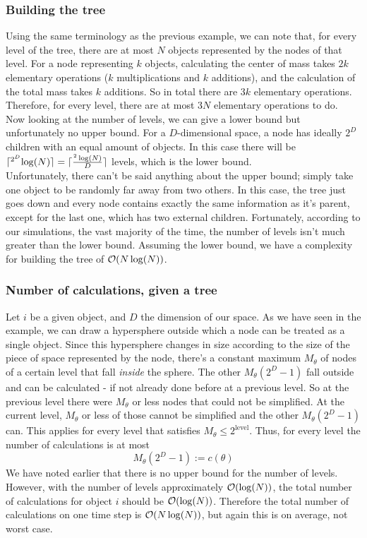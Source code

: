 \subsubsection*{Building the tree} Using the same terminology as the previous example, we can note that, for every level of the tree, there are at most $N$ objects represented by the nodes of that level. For a node representing $k$ objects, calculating the center of mass takes $2k$ elementary operations ($k$ multiplications and $k$ additions), and the calculation of the total mass takes $k$ additions. So in total there are $3k$ elementary operations. Therefore, for every level, there are at most $3N$ elementary operations to do.\\
Now looking at the number of levels, we can give a lower bound but unfortunately no upper bound. For a $D$-dimensional space, a node has ideally $2^D$ children with an equal amount of objects. In this case there will be $\lceil ^{2^D} \log(N) \rceil = \lceil \frac{^2\log(N)}{D} \rceil$ levels, which is the lower bound.\\
Unfortunately, there can't be said anything about the upper bound; simply take one object to be randomly far away from two others. In this case, the tree just goes down and every node contains exactly the same information as it's parent, except for the last one, which has two external children. Fortunately, according to our simulations, the vast majority of the time, the number of levels isn't much greater than the lower bound. Assuming the lower bound, we have a complexity for building the tree of $\mathcal{O}(N\log(N))$.
\subsubsection*{Number of calculations, given a tree} Let $i$ be a given object, and $D$ the dimension of our space. As we have seen in the example, we can draw a hypersphere outside which a node can be treated as a single object. Since this hypersphere changes in size according to the size of the piece of space represented by the node, there's a constant maximum $M_\theta$ of nodes of a certain level that fall \textit{inside} the sphere. The other $M_\theta(2^D-1)$ fall outside and can be calculated - if not already done before at a previous level. So at the previous level there were $M_\theta$ or less nodes that could not be simplified. At the current level, $M_\theta$ or less of those cannot be simplified and the other $M_\theta(2^D-1)$ can. This applies for every level that satisfies $M_\theta \leq 2^{\text{level}}$. Thus, for every level the number of calculations is at most
\[
M_\theta (2^D-1) := c(\theta)
\]
We have noted earlier that there is no upper bound for the number of levels. However, with the number of levels approximately $\mathcal{O}(\log(N))$, the total number of calculations for object $i$ should be $\mathcal{O}(\log(N))$. Therefore the total number of calculations on one time step is $\mathcal{O}(N\log(N))$, but again this is on average, not worst case.
